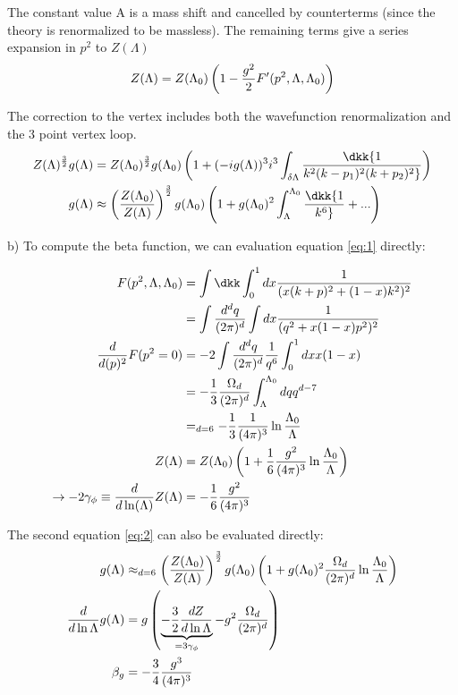 \documentclass[9pt]{scrartcl}
\begin{document}
The constant value A is a mass shift and cancelled by counterterms (since the theory is renormalized to be massless).  The remaining terms give a series expansion in $p^2$ to $Z(\Lambda)$
\begin{align}
Z(\Lambda) = Z(\Lambda_0) \left( 1 - {g^2 \over 2} F'(p^2, \Lambda, \Lambda_0) \right) \label{eq:1}
\end{align}


The correction to the vertex includes both the wavefunction renormalization and the 3 point vertex loop.
\begin{align}
	Z(\Lambda)^{3 \over 2} g(\Lambda) &= Z(\Lambda_0)^{3 \over 2} g(\Lambda_0) \left( 1 + {(-i g(\Lambda))^3} i^3 \int_{\delta \Lambda} \dkk {1 \over k^2 (k - p_1)^2 (k+p_2)^2} \right) \\
	g(\Lambda)& \approx \left({Z(\Lambda_0) \over Z(\Lambda)} \right)^{3 \over 2} g(\Lambda_0) \left(1 + g(\Lambda_0)^2  \int_{\Lambda}^{\Lambda_0} \dkk {1 \over k^6} + ... \right) \label{eq:2}
	\end{align}

b)  To compute the beta function, we can evaluation equation \eqref{eq:1} directly:

\begin{align}
	F(p^2, \Lambda, \Lambda_0) & = \int \dkk \int_0^1 dx {1 \over (x (k+p)^2 + (1-x)k^2)^2} \\
	& = \int {d^d q \over (2 \pi)^d} \int dx {1 \over (q^2 + x(1-x) p^2)^2 } \\
	{d \over d(p)^2} F (p^2 = 0) &= -2 \int  {d^d q \over (2 \pi)^d} {1 \over q^6} \int_0^1 dx x(1-x) \\
	&=-\frac13 {\Omega_{d} \over (2 \pi)^d} \int_{\Lambda}^{\Lambda_0} dq  q^{d-7} \\
	& =_{d = 6} -\frac 13 {1 \over (4 \pi)^3} \ln {\Lambda_0 \over \Lambda} \\
	Z(\Lambda) &= Z(\Lambda_0) \left(1 + \frac16 {g^2 \over (4 \pi)^3} \ln {\Lambda_0 \over \Lambda} \right)  \\
    \rightarrow  -2 \gamma_{\phi} \equiv {d \over d \ln(\Lambda)} Z(\Lambda) &=  -\frac16 {g^2 \over (4 \pi)^3}
	\end{align}

The second equation \eqref{eq:2} can also be evaluated directly:
\begin{align}
	g(\Lambda)& \approx_{d =6} \left({Z(\Lambda_0) \over Z(\Lambda)} \right)^{3 \over 2} g(\Lambda_0) \left(1 + g(\Lambda_0)^2  {\Omega_d \over (2 \pi)^d} \ln {\Lambda_0 \over \Lambda} \right) \\
	{d \over d \ln \Lambda} g( \Lambda) &= g \left( \underbrace{- \frac32 {dZ \over d \ln \Lambda}}_{= 3 \gamma_{\phi}} - g^2 {\Omega_d \over (2 \pi)^d} \right) \\
	\beta_{g} &= - {3 \over 4} {g^3 \over (4 \pi)^3}
	\end{align}
\end{document}

